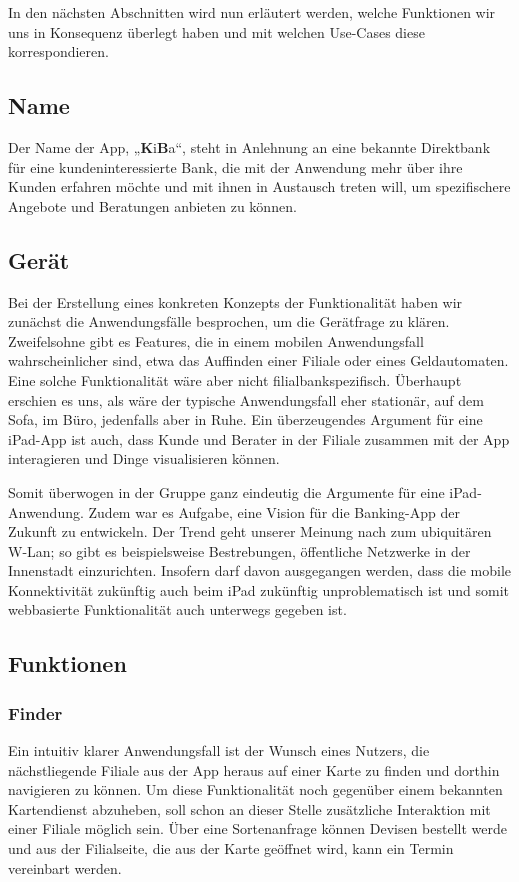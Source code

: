 In den nächsten Abschnitten wird nun erläutert werden, welche Funktionen wir uns in Konsequenz überlegt haben und mit welchen Use-Cases diese korrespondieren.

\subsection{Name}
    Der Name der App, „\textbf{K}i\textbf{B}a“, steht in Anlehnung an eine bekannte Direktbank für eine kundeninteressierte Bank, die mit der Anwendung mehr über ihre Kunden erfahren möchte und mit ihnen in Austausch treten will, um spezifischere Angebote und Beratungen anbieten zu können.
    
\subsection{Gerät}
    Bei der Erstellung eines konkreten Konzepts der Funktionalität haben wir zunächst die Anwendungsfälle besprochen, um die Gerätfrage zu klären. Zweifelsohne gibt es Features, die in einem mobilen Anwendungsfall wahrscheinlicher sind, etwa das Auffinden einer Filiale oder eines Geldautomaten. Eine solche Funktionalität wäre aber nicht filialbankspezifisch. Überhaupt erschien es uns, als wäre der typische Anwendungsfall eher stationär, auf dem Sofa, im Büro, jedenfalls aber in Ruhe. Ein überzeugendes Argument für eine iPad-App ist auch, dass Kunde und Berater in der Filiale zusammen mit der App interagieren und Dinge visualisieren können.     
    
    Somit überwogen in der Gruppe ganz eindeutig die Argumente für eine iPad-Anwendung. Zudem war es Aufgabe, eine Vision für die Banking-App der Zukunft zu entwickeln. Der Trend geht unserer Meinung nach zum ubiquitären W-Lan; so gibt es beispielsweise Bestrebungen, öffentliche Netzwerke in der Innenstadt einzurichten. Insofern darf davon ausgegangen werden, dass die mobile Konnektivität zukünftig auch beim iPad zukünftig unproblematisch ist und somit webbasierte Funktionalität auch unterwegs gegeben ist.
    
\subsection{Funktionen}

\subsubsection{Finder}
Ein intuitiv klarer Anwendungsfall ist der Wunsch eines Nutzers, die nächstliegende Filiale aus der App heraus auf einer Karte zu finden und dorthin navigieren zu können. Um diese Funktionalität noch gegenüber einem bekannten Kartendienst abzuheben, soll schon an dieser Stelle zusätzliche Interaktion mit einer Filiale möglich sein. Über eine Sortenanfrage können Devisen bestellt werde und aus der Filialseite, die aus der Karte geöffnet wird, kann ein Termin vereinbart werden.

